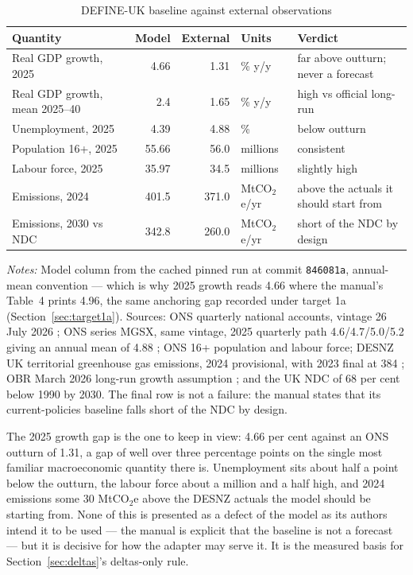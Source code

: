 \begin{table}[t]
\centering
\caption{DEFINE-UK baseline against external observations}
\label{tab:calibration}
\footnotesize
\begin{tabularx}{\textwidth}{@{}>{\raggedright\arraybackslash}Xrrl>{\raggedright\arraybackslash}X@{}}
\toprule
Quantity & Model & External & Units & Verdict \\
\midrule
Real GDP growth, 2025 & 4.66 & 1.31 & \% y/y & far above outturn; never a forecast \\
Real GDP growth, mean 2025--40 & 2.4 & 1.65 & \% y/y & high vs official long-run \\
Unemployment, 2025 & 4.39 & 4.88 & \% & below outturn \\
Population 16+, 2025 & 55.66 & 56.0 & millions & consistent \\
Labour force, 2025 & 35.97 & 34.5 & millions & slightly high \\
Emissions, 2024 & 401.5 & 371.0 & MtCO$_2$e/yr & above the actuals it should start from \\
Emissions, 2030 vs NDC & 342.8 & 260.0 & MtCO$_2$e/yr & short of the NDC by design \\
\bottomrule
\end{tabularx}
\par\smallskip
\parbox{0.97\textwidth}{\footnotesize \emph{Notes:} Model column from the cached pinned run at commit \texttt{846081a}, annual-mean convention --- which is why 2025 growth reads 4.66 where the manual's Table~4 prints 4.96, the same anchoring gap recorded under target 1a (Section~\ref{sec:target1a}). Sources: ONS quarterly national accounts, vintage 26 July 2026 \citep{ons2026gdp}; ONS series MGSX, same vintage, 2025 quarterly path 4.6/4.7/5.0/5.2 giving an annual mean of 4.88 \citep{ons2026lms}; ONS 16+ population and labour force; DESNZ UK territorial greenhouse gas emissions, 2024 provisional, with 2023 final at 384 \citep{desnz2025ghg}; OBR March 2026 long-run growth assumption \citep{obr2026efo}; and the UK NDC of 68 per cent below 1990 by 2030. The final row is not a failure: the manual states that its current-policies baseline falls short of the NDC by design.}
\end{table}

The 2025 growth gap is the one to keep in view: 4.66 per cent against an ONS outturn of 1.31, a gap of well over three percentage points on the single most familiar macroeconomic quantity there is. Unemployment sits about half a point below the outturn, the labour force about a million and a half high, and 2024 emissions some 30 MtCO$_2$e above the DESNZ actuals the model should be starting from. None of this is presented as a defect of the model as its authors intend it to be used --- the manual is explicit that the baseline is not a forecast --- but it is decisive for how the adapter may serve it. It is the measured basis for Section~\ref{sec:deltas}'s deltas-only rule.

